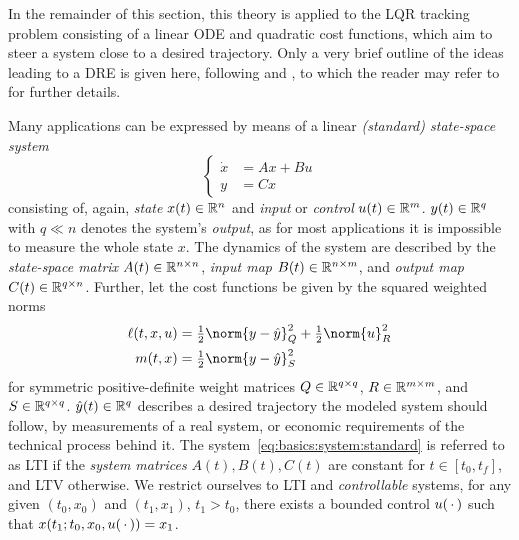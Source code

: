 In the remainder of this section,
this theory is applied to the \ac{LQR} tracking problem
consisting of a linear \ac{ODE} and quadratic cost functions,
which aim to steer a system close to a desired trajectory.
Only a very brief outline of the ideas leading to a \ac{DRE} is given here,
following \cite[Remarks~3.3 and~3.6]{Locatelli2011} and \cite[Section~3.2.2]{Lang2017},
to which the reader may refer to for further details.

Many applications can be expressed by means of a
linear \emph{(standard) state-space system}
\begin{equation}
\label{eq:basics:system:standard}
\left\{
\begin{aligned}
  \dot x &= Ax + Bu \\
  y &= Cx
\end{aligned}
\right.
\end{equation}
consisting of, again, \emph{state} $x(t)\in\mathbb{R}^n$ and \emph{input} or \emph{control} $u(t)\in\mathbb{R}^m$.
$y(t) \in\mathbb{R}^q$ with $q \ll n$ denotes the system's \emph{output},
as for most applications it is impossible to measure the whole state $x$.
The dynamics of the system are described by the
\emph{state-space matrix} $A(t) \in \mathbb{R}^{n\times n}$,
\emph{input map} $B(t) \in\mathbb{R}^{n \times m}$,
and
\emph{output map} $C(t) \in\mathbb{R}^{q\times n}$.
Further, let the cost functions be given by the squared weighted norms
\begin{equation}
\label{eq:basics:LQR:cost}
\begin{aligned}
  \ell(t, x, u)
  &= \tfrac{1}{2}\norm{y - \hat y}_Q^2 + \tfrac{1}{2}\norm{u}_R^2 \\
  m(t, x)
  &= \tfrac{1}{2} \norm{y - \hat y}_S^2
\end{aligned}
\end{equation}
for symmetric positive-definite weight matrices
$Q\in\mathbb{R}^{q\times q}$,
$R\in\mathbb{R}^{m\times m}$, and
$S\in\mathbb{R}^{q\times q}$.
$\hat y(t) \in\mathbb{R}^q$ describes a desired trajectory the modeled system should follow,
\eg by measurements of a real system, or economic requirements of the technical process behind it.
The system~\eqref{eq:basics:system:standard} is referred to as \ac{LTI}
if the \emph{system matrices} $A(t), B(t), C(t)$ are constant for $t\in [t_0,t_f]$,
and \ac{LTV} otherwise.
We restrict ourselves to \ac{LTI} and \emph{controllable} systems,
\ie for any given $(t_0, x_0)$ and $(t_1, x_1)$, $t_1 > t_0$,
there exists a bounded control $u(\optional{})$ such that $x(t_1; t_0, x_0, u(\optional{})) = x_1$.

